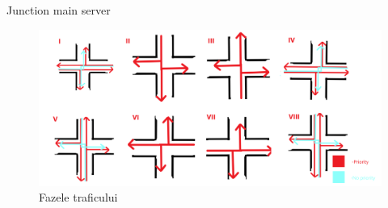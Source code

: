 \documentclass{beamer}
\begin{document}
    \begin{frame}{Junction main server}
        \begin{figure}[h!]
            \includegraphics[width=\textwidth]{Sketches/AvailableJunctionphases.png}
            \caption{Fazele traficului}
            \label{fig:Junction_phases}
        \end{figure}

    \end{frame}
\end{document}
